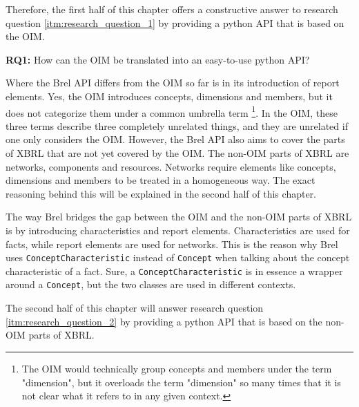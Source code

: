 Therefore, the first half of this chapter offers a constructive answer to research question \ref{itm:research_question_1} 
by providing a python API that is based on the OIM.

\begin{displayquote}
    \textbf{RQ1:} How can the OIM be translated into an easy-to-use python API?
\end{displayquote}

Where the Brel API differs from the OIM so far is in its introduction of report elements.
Yes, the OIM introduces concepts, dimensions and members, but it does not categorize them under a common umbrella term
\footnote{The OIM would technically group concepts and members under the term "dimension", 
but it overloads the term "dimension" so many times that it is not clear what it refers to in any given context.}.
In the OIM, these three terms describe three completely unrelated things, and they are unrelated if one only considers the OIM.
However, the Brel API also aims to cover the parts of XBRL that are not yet covered by the OIM.
The non-OIM parts of XBRL are networks, components and resources.
Networks require elements like concepts, dimensions and members to be treated in a homogeneous way.
The exact reasoning behind this will be explained in the second half of this chapter.

The way Brel bridges the gap between the OIM and the non-OIM parts of XBRL is by introducing characteristics and report elements.
Characteristics are used for facts, while report elements are used for networks.
This is the reason why Brel uses \texttt{ConceptCharacteristic} instead of \texttt{Concept} when talking about the concept characteristic of a fact.
Sure, a \texttt{ConceptCharacteristic} is in essence a wrapper around a \texttt{Concept}, 
but the two classes are used in different contexts.

The second half of this chapter will answer research question \ref{itm:research_question_2} 
by providing a python API that is based on the non-OIM parts of XBRL.

